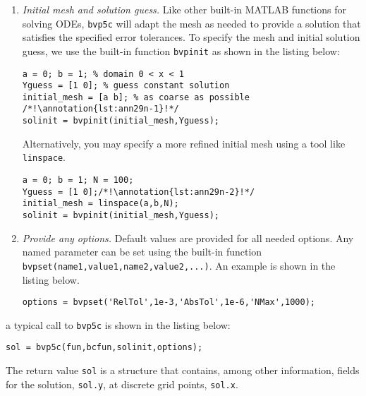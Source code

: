 \begin{enumerate}
\item \emph{Initial mesh and solution guess.} Like other built-in MATLAB functions for solving ODEs, \lstinline[style=myMatlab]{bvp5c} will adapt the mesh as needed to provide a solution that satisfies the specified error tolerances. To specify the mesh and initial solution guess, we use the built-in function \lstinline[style=myMatlab]{bvpinit} as shown in the listing below:
\begin{lstlisting}[style=myMatlab]
a = 0; b = 1; % domain 0 < x < 1
Yguess = [1 0]; % guess constant solution
initial_mesh = [a b]; % as coarse as possible /*!\annotation{lst:ann29n-1}!*/
solinit = bvpinit(initial_mesh,Yguess);
\end{lstlisting}
Alternatively, you may specify a more refined initial mesh using a tool like \lstinline[style=myMatlab]{linspace}. 
\begin{lstlisting}[style=myMatlab]
a = 0; b = 1; N = 100;
Yguess = [1 0];/*!\annotation{lst:ann29n-2}!*/
initial_mesh = linspace(a,b,N);
solinit = bvpinit(initial_mesh,Yguess);
\end{lstlisting}

\item \emph{Provide any options.}  Default values are provided for all needed options.  Any named parameter can be set using the built-in function \lstinline[style=myMatlab]{bvpset(name1,value1,name2,value2,...)}.  An example is shown in the listing below.
\begin{lstlisting}[style=myMatlab]
options = bvpset('RelTol',1e-3,'AbsTol',1e-6,'NMax',1000);
\end{lstlisting} 

\end{enumerate}

 a typical call to \lstinline[style=myMatlab]{bvp5c} is shown in the listing below:
\begin{lstlisting}[style=myMatlab]
sol = bvp5c(fun,bcfun,solinit,options);
\end{lstlisting}
The return value \lstinline[style=myMatlab]{sol} is a structure that contains, among other information, fields for the solution, \lstinline[style=myMatlab]{sol.y}, at discrete grid points, \lstinline[style=myMatlab]{sol.x}.

